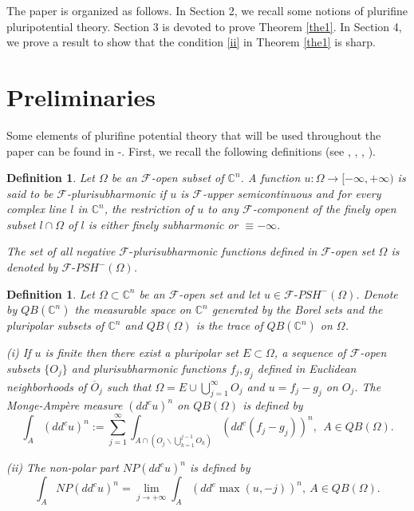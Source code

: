\documentclass[3p,times]{elsarticle}
\numberwithin{equation}{section}
\newtheorem{definition}[theorem]{Definition}
\newtheorem{The main theorem}[theorem]{The main theorem}
\theoremstyle{definition}
\begin{document}
The paper is organized as follows. In Section 2, we recall some notions of  plurifine   pluripotential theory.
Section 3 is devoted to prove  Theorem \ref{the1}. 
In Section 4,  we prove a result to  show that the condition \eqref{ii} in Theorem \ref{the1} is sharp.


\section{Preliminaries}
Some elements of  plurifine potential  theory  that will be used  throughout  the paper can be  found  in \cite{ACCH}-\cite{W12}.  First, we  recall  the following definitions (see \cite{K03},  \cite{KFW11},  \cite{MW10}, \cite{W12}).

\begin{definition} {\rm  
Let $\Omega$ be  an $\mathcal F$-open   subset of $\mathbb C^n$. A function $u : \Omega \to  [-\infty, +\infty) $  is said to be  $\mathcal F$-plurisubharmonic if $u$ is $\mathcal F$-upper semicontinuous and for every complex line $l$ in $\mathbb C^n$, the restriction of $u$ to any $\mathcal F$-component of the finely open subset $l \cap \Omega$  of $l$ is either finely subharmonic or $\equiv -\infty$.


The set of all negative  $\mathcal F\text{-}$plurisubharmonic functions defined in $\mathcal F\text{-}$open set $\Omega$ is denoted by $\mathcal F\text{-}  PSH^-(\Omega)$.
}\end{definition}



\begin{definition}{\rm 
Let $\Omega\subset \mathbb C^n$ be an $\mathcal F$-open set   and let $u  \in \mathcal F\text{-} PSH^-(\Omega)$. Denote by    $QB(\mathbb C^n)$  the measurable space on $\mathbb C^n$ generated by the Borel sets and the pluripolar subsets of  $\mathbb C^n$ and $QB(\Omega)$  is  the trace of $QB(\mathbb C^n)$ on $\Omega$.

(i) If $u $ is finite then there exist a pluripolar set $E\subset \Omega$, a sequence of $\mathcal F$-open subsets  $\{O_j\}$   and   
plurisubharmonic functions  $f_{j}, g_{j}$ defined in Euclidean neighborhoods of $\overline O_j$  such that   
 $\Omega=E \cup \bigcup_{j =1}^\infty O_j $ and   $u=f_{j} -g_{j}$ on $O_j $.
The Monge-Amp\`ere measure   $(dd^c u)^n$ on $QB(\Omega)$  is defined by  
$$
\int_A  (dd^c u)^n     := \sum_{j=1}^\infty \int_{A\cap ( O_j \backslash \bigcup_{k=1}^{j-1} O_k ) }  (dd^c ( f_{j} -g_{j}))^n, \ \ A\in QB(\Omega).
$$ 

(ii) The non-polar part $NP(dd^c u)^n$  is defined by
 $$
\int_A NP(dd^c u)^n = \lim_{j\to+\infty} \int_A  (dd^c \max(u,-j))^n, \ A\in QB(\Omega).
$$ 
}\end{definition}
\end{document}
